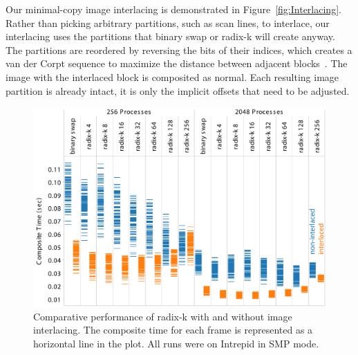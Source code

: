 \documentclass{sig-alternate}
\newcommand*{\lcite}[1]{~\cite{#1}}
\begin{document}
Our minimal-copy image interlacing is demonstrated in
Figure~\ref{fig:Interlacing}.  Rather than picking arbitrary partitions,
such as scan lines, to interlace, our interlacing uses the partitions that
binary swap or radix-k will create anyway.  The partitions are reordered by
reversing the bits of their indices, which creates a van der Corpt sequence
to maximize the distance between adjacent blocks\lcite{LaValle2006}.  The
image with the interlaced block is composited as normal.  Each resulting
image partition is already intact, it is only the implicit offsets that
need to be adjusted.

\begin{figure}%
  \centering
  \includegraphics[width=\linewidth]{images/Interlace}
  \caption{Comparative performance of radix-k with and without image
    interlacing.  The composite time for each frame is represented as a
    horizontal line in the plot.  All runs were on Intrepid in SMP mode.}
  \label{fig:InterlacePerformance}
\end{figure}
\end{document}
